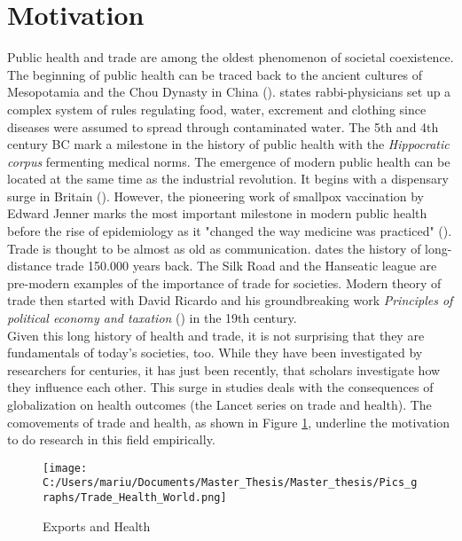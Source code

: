 \documentclass{article}
\begin{document}
\section{Motivation}

Public health and trade are among the oldest phenomenon of societal coexistence. The beginning of public health can be traced back to the ancient cultures of Mesopotamia and the Chou Dynasty in China (\cite{porter2005health}). \cite{preuss2004biblical} states rabbi-physicians set up a complex system of rules regulating food, water, excrement and clothing since diseases were assumed to spread through contaminated water. The 5th and 4th century BC mark a milestone in the history of public health with the \textit{Hippocratic corpus} fermenting medical norms. The emergence of modern public health can be located at the same time as the industrial revolution. It begins with a dispensary surge in Britain (\cite{loudon1981origins}). However, the pioneering work of smallpox vaccination by Edward Jenner marks the most important milestone in modern public health before the rise of epidemiology as it "changed the way medicine was practiced" (\cite{riedel2005edward}).\\
Trade is thought to be almost as old as communication. \cite{watson2009ideas} dates the history of long-distance trade 150.000 years back. The Silk Road and the Hanseatic league are pre-modern examples of the importance of trade for societies. Modern theory of trade then started with David Ricardo and his groundbreaking work \textit{Principles of political economy and taxation} (\cite{ricardo1891principles}) in the 19th century. \\
Given this long history of health and trade, it is not surprising that they are fundamentals of today's societies, too. While they have been investigated by researchers for centuries, it has just been recently, that scholars investigate how they influence each other. This surge in studies deals with the consequences of globalization on health outcomes (the Lancet series on trade and health). The comovements of trade and health, as shown in Figure \ref{Exports and Health}, underline the motivation to do research in this field empirically.

\begin{figure}[!ht]
\begin{center}\caption{Exports and Health \label{Exports and Health}}
\texttt{[image: C:/Users/mariu/Documents/Master\_Thesis/Master\_thesis/Pics\_graphs/Trade\_Health\_World.png]} \\
\end{center}
\end{figure}
\end{document}
